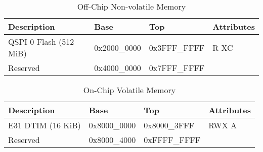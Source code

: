 \documentclass[a4paper,12pt,twoside]{report}
\begin{document}
            	\begin{table}[H]
            		\centering
            		\begin{tabular}{| p{4.5cm} | p{3cm} | p{3cm} | p{2.5cm} |}
            			\hline
            			\textbf{Description} & \textbf{Base} & \textbf{Top} & \textbf{Attributes}\\
            			\hline
            			\hline
            			QSPI 0 Flash (512 MiB) & 0x2000\_0000 & 0x3FFF\_FFFF & R XC\\
            			Reserved & 0x4000\_0000 & 0x7FFF\_FFFF & \\
            			\hline
            		\end{tabular}
            		\caption{Off-Chip Non-volatile Memory}
            	\end{table}

            	\begin{table}[H]
            		\centering
            		\begin{tabular}{| p{4.5cm} | p{3cm} | p{3cm} | p{2.5cm} |}
            			\hline
            			\textbf{Description} & \textbf{Base} & \textbf{Top} & \textbf{Attributes}\\
            			\hline
            			\hline
            			E31 DTIM (16 KiB) & 0x8000\_0000 & 0x8000\_3FFF & RWX A\\
            			Reserved & 0x8000\_4000 & 0xFFFF\_FFFF & \\
            			\hline
            		\end{tabular}
            		\caption{On-Chip Volatile Memory}
            	\end{table}

    \printbibliography
\end{document}
